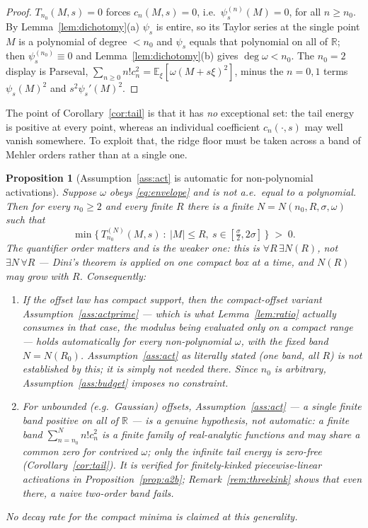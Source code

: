 \documentclass[11pt]{article}
\newtheorem{proposition}{Proposition}
\theoremstyle{remark}
\newcommand{\E}{\mathbb{E}}
\newcommand{\R}{\mathbb{R}}
\begin{document}
\begin{proof}
$T_{n_0}(M,s) = 0$ forces $c_n(M,s) = 0$, i.e.\ $\psi_s^{(n)}(M) = 0$, for all $n \ge n_0$. By Lemma~\ref{lem:dichotomy}(a) $\psi_s$ is entire, so its Taylor series at the single point $M$ is a polynomial of degree $< n_0$ and $\psi_s$ equals that polynomial on all of $\R$; then $\psi_s^{(n_0)} \equiv 0$ and Lemma~\ref{lem:dichotomy}(b) gives $\deg\omega < n_0$. The $n_0 = 2$ display is Parseval, $\sum_{n\ge0}n!c_n^2 = \E_\xi[\omega(M+s\xi)^2]$, minus the $n = 0,1$ terms $\psi_s(M)^2$ and $s^2\psi_s'(M)^2$.
\end{proof}

\noindent The point of Corollary~\ref{cor:tail} is that it has \emph{no} exceptional set: the tail energy is positive at every point, whereas an individual coefficient $c_n(\cdot,s)$ may well vanish somewhere. To exploit that, the ridge floor must be taken across a band of Mehler orders rather than at a single one.

\begin{proposition}[Assumption~\ref{ass:act} is automatic for non-polynomial activations]\label{prop:a2}
Suppose $\omega$ obeys \eqref{eq:envelope} and is not a.e.\ equal to a polynomial. Then for every $n_0 \ge 2$ and every \emph{finite} $R$ there is a finite $N = N(n_0, R, \sigma, \omega)$ such that
\[
\min\big\{\,T^{(N)}_{n_0}(M,s)\ :\ |M|\le R,\ s\in[\tfrac\sigma2,2\sigma]\,\big\} \;>\; 0 .
\]
The quantifier order matters and is the weaker one: this is $\forall R\,\exists N(R)$, \emph{not} $\exists N\,\forall R$ --- Dini's theorem is applied on one compact box at a time, and $N(R)$ may grow with $R$. Consequently:
\begin{enumerate}
\item[(a)] If the offset law has compact support, then the compact-offset variant Assumption~\ref{ass:actprime} --- which is what Lemma~\ref{lem:ratio} actually consumes in that case, the modulus being evaluated only on a compact range --- holds \emph{automatically} for every non-polynomial $\omega$, with the fixed band $N = N(R_0)$. Assumption~\ref{ass:act} as literally stated (one band, all $R$) is \emph{not} established by this; it is simply not needed there. Since $n_0$ is arbitrary, Assumption~\ref{ass:budget} imposes no constraint.
\item[(b)] For unbounded (e.g.\ Gaussian) offsets, Assumption~\ref{ass:act} --- a single finite band positive on all of $\R$ --- is a \emph{genuine hypothesis}, not automatic: a finite band $\sum_{n=n_0}^N n!c_n^2$ is a finite family of real-analytic functions and may share a common zero for contrived $\omega$; only the infinite tail energy is zero-free (Corollary~\ref{cor:tail}). It is verified for finitely-kinked piecewise-linear activations in Proposition~\ref{prop:a2b}; Remark~\ref{rem:threekink} shows that even there, a naive two-order band fails.
\end{enumerate}
No decay rate for the compact minima is claimed at this generality.
\end{proposition}
\end{document}
